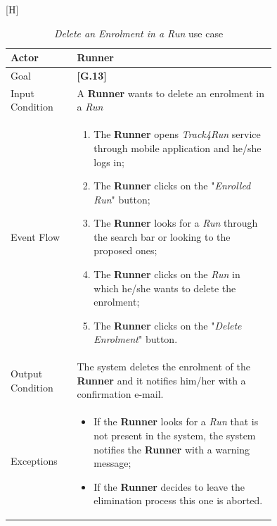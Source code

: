 \begin{center}[H]
\begin{table}
\begin{tabular}{ | l | p{0.75\linewidth} | }
  \hline
    Actor & \textbf{Runner} \\ \hline
    Goal & \textbf{[G.13]} \\ \hline
    Input Condition & A \textbf{Runner} wants to delete an enrolment in a \textit{Run} \\ \hline
    Event Flow & \begin{minipage}[t]{0.7\textwidth}
      \begin{enumerate}
        \item The \textbf{Runner} opens \textit{Track4Run} service through mobile application and he/she logs in;
        \item The \textbf{Runner} clicks on the "\textit{Enrolled Run}" button;
        \item The \textbf{Runner} looks for a \textit{Run} through the search bar or looking to the proposed ones;
        \item The \textbf{Runner} clicks on the \textit{Run} in which he/she wants to delete the enrolment;
        \item The \textbf{Runner} clicks on the "\textit{Delete Enrolment}" button.
      \end{enumerate}
    \smallskip
  \end{minipage} \\ \hline
  Output Condition & The system deletes the enrolment of the \textbf{Runner} and it notifies him/her with a confirmation e-mail. \\ \hline
  Exceptions & \begin{minipage}[t]{0.7\textwidth}
    \begin{itemize}
      \smallskip
      \item If the \textbf{Runner} looks for a \textit{Run} that is not present in the system, the system notifies the \textbf{Runner} with a warning message;
      \item If the \textbf{Runner} decides to leave the elimination process this one is aborted.
    \end{itemize}
    \smallskip
  \end{minipage}  \\ \hline
\end{tabular}
\caption{\textit{Delete an Enrolment in a Run} use case}
\label{table:deleteEnrolmentTable}
\end{table}
\end{center}

